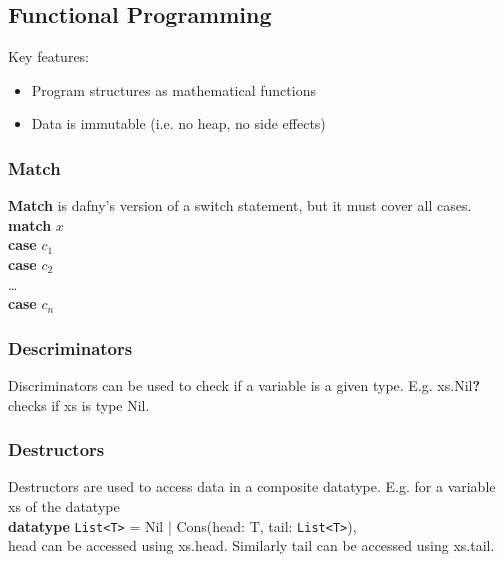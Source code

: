 \subsection{Functional Programming}
Key features:
\begin{itemize}
        \item Program structures as mathematical functions
        \item Data is immutable (i.e. no heap, no side effects)
\end{itemize}

\subsubsection{Match}

\textbf{Match} is dafny's version of a switch statement, but it must cover all cases.\\
\tab \textbf{match} $x$\\
\tab \textbf{case} $c_1$\\
\tab \textbf{case} $c_2$\\
\tab \ldots\\
\tab \textbf{case} $c_n$\\

\subsubsection{Descriminators}
Discriminators can be used to check if a variable is a given type. E.g. xs.Nil\textbf{?} checks if xs is type Nil.

\subsubsection{Destructors}
Destructors are used to access data in a composite datatype. E.g. for a variable xs of the datatype\\
\textbf{datatype} \verb!List<T>! = Nil | Cons(head: T, tail: \verb!List<T>!),\\
head can be accessed using xs.head. Similarly tail can be accessed using xs.tail.

